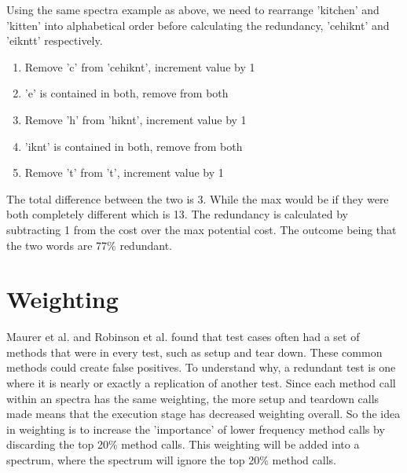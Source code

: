 Using the same spectra example as above, we need to rearrange 'kitchen' and 'kitten' into alphabetical order before calculating the redundancy, 'cehiknt' and 'eikntt' respectively.

\begin{enumerate}
\item Remove 'c' from 'cehiknt', increment value by 1
\item 'e' is contained in both, remove from both
\item Remove 'h' from 'hiknt', increment value by 1
\item 'iknt' is contained in both, remove from both
\item Remove 't' from 't', increment value by 1
\end{enumerate}

The total difference between the two is 3. While the max would be if they were both completely different which is 13. The redundancy is calculated by subtracting 1 from the cost over the max potential cost. The outcome being that the two words are 77\% redundant.

\section{Weighting}

Maurer et al. \cite{koochakzadeh2009test} and Robinson et al. \cite{li2008static} found that test cases often had a set of methods that were in every test, such as setup and tear down. These common methods could create false positives. To understand why, a redundant test is one where it is nearly or exactly a replication of another test. Since each method call within an spectra has the same weighting, the more setup and teardown calls made means that the execution stage has decreased weighting overall. So the idea in weighting is to increase the 'importance' of lower frequency method calls by discarding the top 20\% method calls. This weighting will be added into a spectrum, where the spectrum will ignore the top 20\% method calls.

